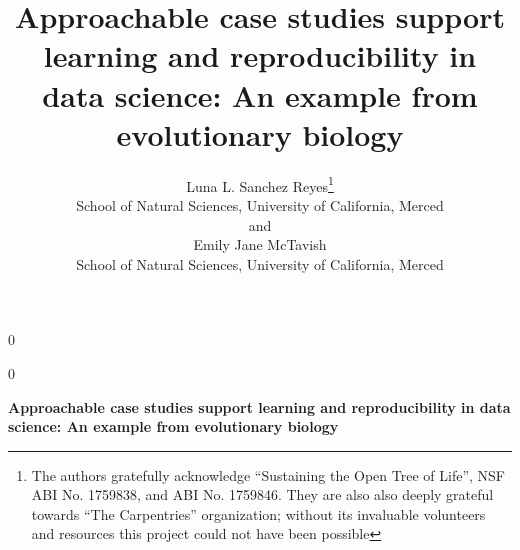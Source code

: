 \documentclass[12pt]{article}
\newcommand{\blind}{0}
\begin{document}
%
%


\def\spacingset#1{\renewcommand{\baselinestretch}%
{#1}\small\normalsize} \spacingset{1}



\blind
{
  \title{\bf Approachable case studies support learning and reproducibility in data science: An example from evolutionary biology}
  \author{Luna L. Sanchez Reyes\thanks{
    The authors gratefully acknowledge ``Sustaining the Open Tree of Life'',
    NSF ABI No. 1759838, and ABI No. 1759846. They are also also deeply grateful towards
    ``The Carpentries'' organization; without its invaluable volunteers and resources
    this project could not have been possible}\hspace{.2cm}\\
    School of Natural Sciences, University of California, Merced\\
    and \\
    Emily Jane McTavish \\
    School of Natural Sciences, University of California, Merced}
  \maketitle
} \fi

\blind
{
  \bigskip
  \bigskip
  \bigskip
  \begin{center}
    {\LARGE\bf Approachable case studies support learning and reproducibility in data science: An example from evolutionary biology}
\end{center}
  \medskip
} \fi
\end{document}
